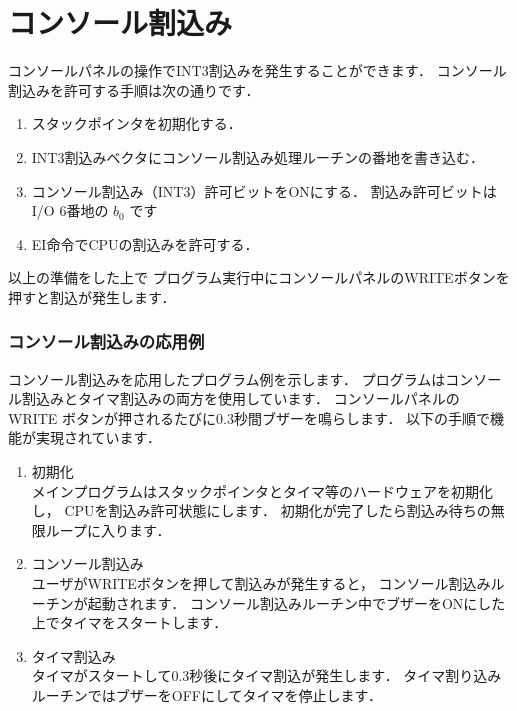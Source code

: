 \newpage
\section{コンソール割込み}

コンソールパネルの操作でINT3割込みを発生することができます．
コンソール割込みを許可する手順は次の通りです．

\begin{enumerate}
\item スタックポインタを初期化する．

\item INT3割込みベクタにコンソール割込み処理ルーチンの番地を書き込む．

\item コンソール割込み（INT3）許可ビットをONにする．
割込み許可ビットはI/O 6番地の $b_0$ です

\begin{center}
\end{center}

\item EI命令でCPUの割込みを許可する．
\end{enumerate}

以上の準備をした上で
プログラム実行中にコンソールパネルのWRITEボタンを押すと割込が発生します．

\subsubsection{コンソール割込みの応用例}

コンソール割込みを応用したプログラム例を示します．
プログラムはコンソール割込みとタイマ割込みの両方を使用しています．
コンソールパネルの WRITE ボタンが押されるたびに0.3秒間ブザーを鳴らします．
以下の手順で機能が実現されています．

\begin{enumerate}
\item 初期化 \\
メインプログラムはスタックポインタとタイマ等のハードウェアを初期化し，
CPUを割込み許可状態にします．
初期化が完了したら割込み待ちの無限ループに入ります．

\item コンソール割込み \\
ユーザがWRITEボタンを押して割込みが発生すると，
コンソール割込みルーチンが起動されます．
コンソール割込みルーチン中でブザーをONにした上でタイマをスタートします．

\item タイマ割込み \\
タイマがスタートして0.3秒後にタイマ割込が発生します．
タイマ割り込みルーチンではブザーをOFFにしてタイマを停止します．

\end{enumerate}

